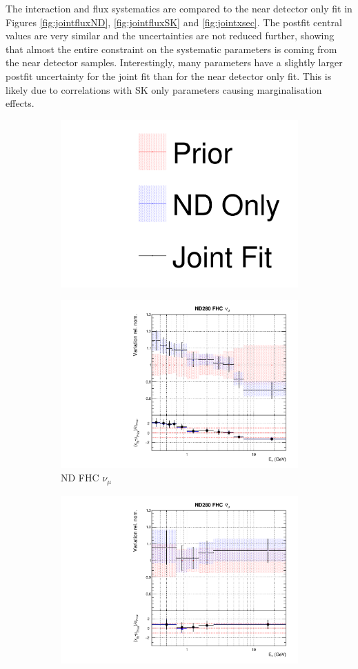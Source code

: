 The interaction and flux systematics are compared to the near detector only fit in Figures \ref{fig:jointfluxND}, \ref{fig:jointfluxSK} and  \ref{fig:jointxsec}. The postfit central values are very similar and the uncertainties are not reduced further, showing that almost the entire constraint on the systematic parameters is coming from the near detector samples. Interestingly, many parameters have a slightly larger postfit uncertainty for the joint fit than for the near detector only fit. This is likely due to correlations with SK only parameters causing marginalisation effects.

\begin{figure}[!htbp]
\centering
\begin{subfigure}{0.8\textwidth}
  \centering
  \includegraphics[width=0.24\linewidth]{figs/joint_leg}
\end{subfigure}
\begin{subfigure}{0.45\textwidth}
  \centering
  \includegraphics[width=0.75\linewidth]{figs/jointflux0}
  \caption{ND FHC $\nu_{\mu}$}
\end{subfigure}
\begin{subfigure}{0.45\textwidth}
  \centering
  \includegraphics[width=0.75\linewidth]{figs/jointflux1}

\end{subfigure}
\end{figure}
